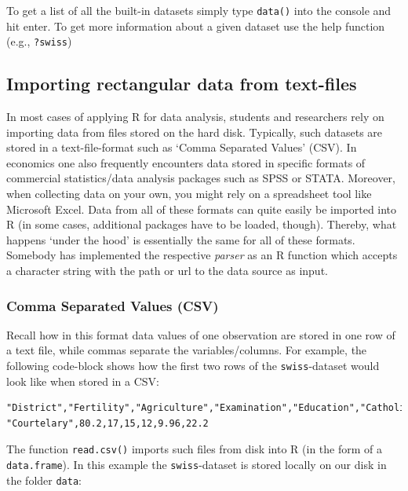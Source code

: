 \documentclass[
  12pt,
]{style/krantz}
\begin{document}
To get a list of all the built-in datasets simply type \texttt{data()} into the console and hit enter. To get more information about a given dataset use the help function (e.g., \texttt{?swiss})

\hypertarget{importing-rectangular-data-from-text-files}{%
\subsection{Importing rectangular data from text-files}\label{importing-rectangular-data-from-text-files}}

In most cases of applying R for data analysis, students and researchers rely on importing data from files stored on the hard disk. Typically, such datasets are stored in a text-file-format such as `Comma Separated Values' (CSV). In economics one also frequently encounters data stored in specific formats of commercial statistics/data analysis packages such as SPSS or STATA. Moreover, when collecting data on your own, you might rely on a spreadsheet tool like Microsoft Excel. Data from all of these formats can quite easily be imported into R (in some cases, additional packages have to be loaded, though). Thereby, what happens `under the hood' is essentially the same for all of these formats. Somebody has implemented the respective \emph{parser} as an R function which accepts a character string with the path or url to the data source as input.

\hypertarget{comma-separated-values-csv}{%
\subsubsection{Comma Separated Values (CSV)}\label{comma-separated-values-csv}}

Recall how in this format data values of one observation are stored in one row of a text file, while commas separate the variables/columns. For example, the following code-block shows how the first two rows of the \texttt{swiss}-dataset would look like when stored in a CSV:

\begin{verbatim}
"District","Fertility","Agriculture","Examination","Education","Catholic","Infant.Mortality"
"Courtelary",80.2,17,15,12,9.96,22.2
\end{verbatim}

The function \texttt{read.csv()} imports such files from disk into R (in the form of a \texttt{data.frame}). In this example the \texttt{swiss}-dataset is stored locally on our disk in the folder \texttt{data}:
\end{document}
